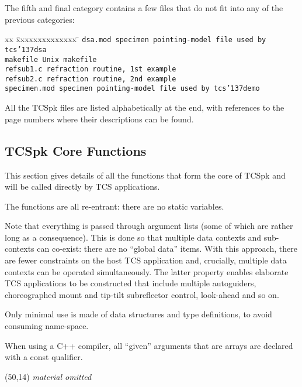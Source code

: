 \documentclass[12pt,fleqn,twoside]{article}
\renewcommand{\_}{{\tt\char'137}}     %
\newcommand{\abridged}  {\vspace{3ex} \begin{center}
                        \framebox(50,14){\vspace*{1mm}
                        \large \it material omitted}
                        \end{center}\vspace{3ex}}
\begin{document}
The fifth and final category contains a few files that do not fit into
any of the previous categories:
\begin{tabbing}
xx \= xxxxxxxxxxxxxx \= \kill
\> \tt dsa.mod      \> specimen pointing-model file used by {\tt tcs\_dsa} \\
\> \tt makefile     \> Unix makefile \\
\> \tt refsub1.c    \> refraction routine, 1st example \\
\> \tt refsub2.c    \> refraction routine, 2nd example \\
\> \tt specimen.mod \> specimen pointing-model file used by {\tt tcs\_demo} \\
\end{tabbing}
All the TCSpk files are listed alphabetically at the end, with references to
the page numbers where their descriptions can be found.
\newpage
\subsection{TCSpk Core Functions}

This section gives details of all the functions that form the core of
TCSpk and will be called directly by TCS applications.

The functions are all re-entrant: there are no static variables.

Note that everything is passed through argument lists (some of which are
rather long as a consequence).  This is done so that multiple data
contexts and sub-contexts
can co-exist: there are no ``global data'' items.  With this
approach, there are fewer constraints on the host TCS application and,
crucially, multiple data contexts can be operated simultaneously.  The
latter property enables elaborate TCS applications to be constructed
that include multiple autoguiders, choreographed mount and tip-tilt
subreflector control, look-ahead and so on.

Only minimal use is made of data structures and type definitions, to
avoid consuming name-space.

When using a C++ compiler, all ``given'' arguments that are arrays are
declared with a const qualifier.

\ifx\vdoc\vshort
\abridged
\else
\end{document}
